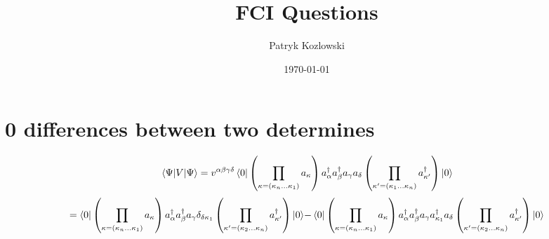 \documentclass[12pt]{article}
\title{FCI Questions}
\author{Patryk Kozlowski}
\date{\today} %
\begin{document}
\maketitle
\section{0 differences between two determines}
\begin{equation}
    \mel{\Psi }{V}{\Psi }
    =v^{\alpha\beta\gamma\delta}\bra{0}\left(\prod_{\kappa=\left(\kappa_{n}\dots\kappa_{1}\right)}a_{\kappa}\right)
        a^{\dag}_{\alpha  }a^{\dag}_{\beta }a_{\gamma }a_{\delta }
    \left(\prod_{\kappa^{\prime}=\left(\kappa_{1}\dots\kappa_{n}\right)}a^{\dag}_{\kappa^{\prime}}\right)\ket{0}
\end{equation}
\begin{subequations}
    \begin{align}
        =\bra{0}\left(\prod_{\kappa=\left(\kappa_{n}\dots\kappa_{1}\right)}a_{\kappa}\right)
            a^{\dag}_{\alpha }a^{\dag}_{\beta }a_{\gamma }\delta _{\delta \kappa _{1}}
        \left(\prod_{\kappa^{\prime}=\left(\kappa_{2}\dots\kappa_{n}\right)}a^{\dag}_{\kappa^{\prime}}\right)\ket{0}
    \end{align}
    \begin{align}
        -\bra{0}\left(\prod_{\kappa=\left(\kappa_{n}\dots\kappa_{1}\right)}a_{\kappa}\right)
            a^{\dag}_{\alpha }a^{\dag}_{\beta }a_{\gamma }a^{\dag}_{\kappa _{1}}a_{\delta }
        \left(\prod_{\kappa^{\prime}=\left(\kappa_{2}\dots\kappa_{n}\right)}a^{\dag}_{\kappa^{\prime}}\right)\ket{0}
    \end{align}
\end{subequations}
\end{document}
